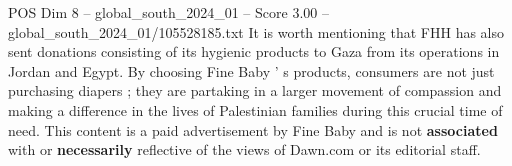 \begin{textsample}{POS Dim 8 – global\_south\_2024\_01 – Score 3.00 – global\_south\_2024\_01/105528185.txt}
It is worth mentioning that FHH has also sent donations consisting of its hygienic products to Gaza from its operations in Jordan and Egypt.
By choosing Fine Baby ' s products, consumers are not just purchasing diapers ; they are partaking in a larger movement of compassion and making a difference in the lives of Palestinian families during this crucial time of need.
This content is a paid advertisement by Fine Baby and is not \textbf{associated} with or \textbf{necessarily} reflective of the views of Dawn.com or its editorial staff.

\end{textsample}

